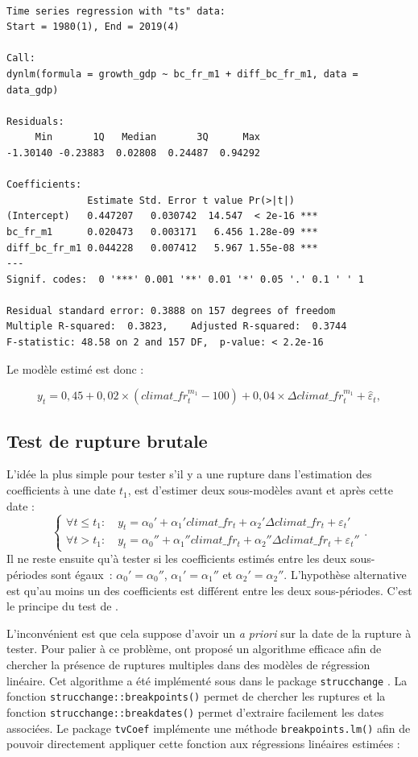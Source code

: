 \documentclass[
  a4paper,
  DIV=11,
  numbers=noendperiod,
  french]{scrartcl}
\newcommand\1{{\mathds 1}}
\theoremstyle{remark}
\begin{document}
\begin{verbatim}

Time series regression with "ts" data:
Start = 1980(1), End = 2019(4)

Call:
dynlm(formula = growth_gdp ~ bc_fr_m1 + diff_bc_fr_m1, data = data_gdp)

Residuals:
     Min       1Q   Median       3Q      Max 
-1.30140 -0.23883  0.02808  0.24487  0.94292 

Coefficients:
              Estimate Std. Error t value Pr(>|t|)    
(Intercept)   0.447207   0.030742  14.547  < 2e-16 ***
bc_fr_m1      0.020473   0.003171   6.456 1.28e-09 ***
diff_bc_fr_m1 0.044228   0.007412   5.967 1.55e-08 ***
---
Signif. codes:  0 '***' 0.001 '**' 0.01 '*' 0.05 '.' 0.1 ' ' 1

Residual standard error: 0.3888 on 157 degrees of freedom
Multiple R-squared:  0.3823,    Adjusted R-squared:  0.3744 
F-statistic: 48.58 on 2 and 157 DF,  p-value: < 2.2e-16
\end{verbatim}

Le modèle estimé est donc :

\[y_t=0,45 + 0,02\times (climat\_fr_t^{m_1} -100)+ 0,04\times \Delta climat\_fr_t^{m_1}+{\hat\varepsilon}_t,\]

\subsection{Test de rupture brutale}\label{sec-test-baiperron}

L'idée la plus simple pour tester s'il y a une rupture dans l'estimation
des coefficients à une date \(t_1\), est d'estimer deux sous-modèles
avant et après cette date : \[
\begin{cases}
\forall t \leq t_1 :\quad y_t = \alpha_0' + \alpha_1' climat\_fr_t + \alpha_2' \Delta climat\_fr_t + \varepsilon_t' \\
\forall t > t_1 :\quad y_t = \alpha_0'' + \alpha_1'' climat\_fr_t + \alpha_2'' \Delta climat\_fr_t + \varepsilon_t''
\end{cases}.
\] Il ne reste ensuite qu'à tester si les coefficients estimés entre les
deux sous-périodes sont égaux~: \(\alpha_0' = \alpha_0''\),
\(\alpha_1' = \alpha_1''\) et \(\alpha_2' = \alpha_2''.\) L'hypothèse
alternative est qu'au moins un des coefficients est différent entre les
deux sous-périodes. C'est le principe du test de \textcite{chowtest}.

L'inconvénient est que cela suppose d'avoir un \emph{a priori} sur la
date de la rupture à tester. Pour palier à ce problème,
\textcite{bai2003computation} ont proposé un algorithme efficace afin de
chercher la présence de ruptures multiples dans des modèles de
régression linéaire. Cet algorithme a été implémenté sous
 dans le package \texttt{strucchange}
\autocite{strucchangeBP}. La fonction
\texttt{strucchange::breakpoints()} permet de chercher les ruptures et
la fonction \texttt{strucchange::breakdates()} permet d'extraire
facilement les dates associées. Le package \texttt{tvCoef} implémente
une méthode \texttt{breakpoints.lm()} afin de pouvoir directement
appliquer cette fonction aux régressions linéaires estimées :
\end{document}
